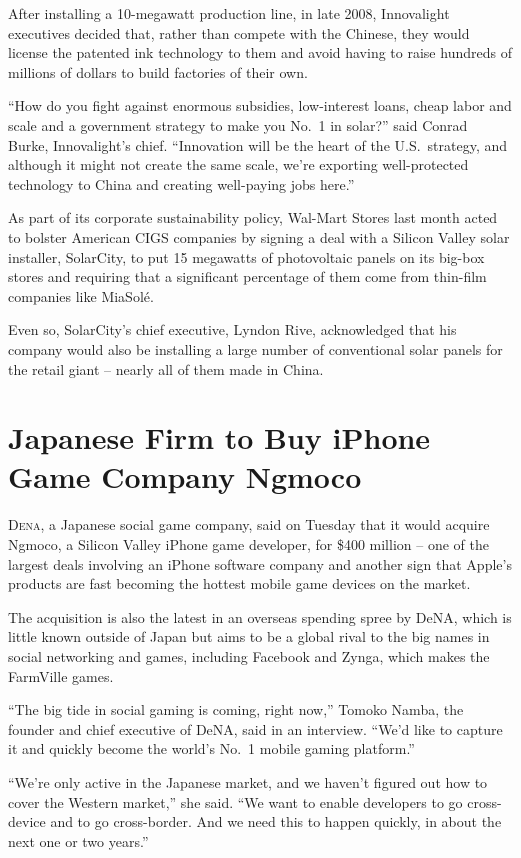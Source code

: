 ﻿\documentclass[12pt]{article}
\begin{document}
After installing a 10-megawatt production line, in late 2008, Innovalight executives decided that,
rather than compete with the Chinese, they would license the patented ink technology to them and
avoid having to raise hundreds of millions of dollars to build factories of their own.

``How do you fight against enormous subsidies, low-interest loans, cheap labor and scale and a
government strategy to make you No.~1 in solar?'' said Conrad Burke, Innovalight's chief.
``Innovation will be the heart of the U.S.~strategy, and although it might not create the same
scale, we're exporting well-protected technology to China and creating well-paying jobs here.''

As part of its corporate sustainability policy, Wal-Mart Stores last month acted to bolster American
CIGS companies by signing a deal with a Silicon Valley solar installer, SolarCity, to put 15
megawatts of photovoltaic panels on its big-box stores and requiring that a significant percentage
of them come from thin-film companies like MiaSol\'e.

Even so, SolarCity's chief executive, Lyndon Rive, acknowledged that his company would also be
installing a large number of conventional solar panels for the retail giant -- nearly all of them
made in China.

\section{Japanese Firm to Buy iPhone Game Company Ngmoco}

\lettrine{D}{ena}, a Japanese social game company, said on Tuesday that it
would acquire Ngmoco, a Silicon Valley iPhone game developer, for \$400 million -- one of the
largest deals involving an iPhone software company and another sign that Apple's products are fast
becoming the hottest mobile game devices on the market.

The acquisition is also the latest in an overseas spending spree by DeNA, which is little known
outside of Japan but aims to be a global rival to the big names in social networking and games,
including Facebook and Zynga, which makes the FarmVille games.

``The big tide in social gaming is coming, right now,'' Tomoko Namba, the founder and chief
executive of DeNA, said in an interview. ``We'd like to capture it and quickly become the world's
No.~1 mobile gaming platform.''

``We're only active in the Japanese market, and we haven't figured out how to cover the Western
market,'' she said. ``We want to enable developers to go cross-device and to go cross-border. And we
need this to happen quickly, in about the next one or two years.''
\end{document}
